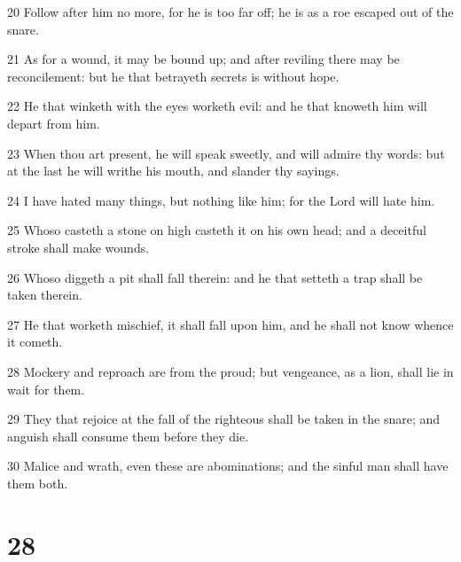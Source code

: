 \par 20 Follow after him no more, for he is too far off; he is as a roe escaped out of the snare.
\par 21 As for a wound, it may be bound up; and after reviling there may be reconcilement: but he that betrayeth secrets is without hope.
\par 22 He that winketh with the eyes worketh evil: and he that knoweth him will depart from him.
\par 23 When thou art present, he will speak sweetly, and will admire thy words: but at the last he will writhe his mouth, and slander thy sayings.
\par 24 I have hated many things, but nothing like him; for the Lord will hate him.
\par 25 Whoso casteth a stone on high casteth it on his own head; and a deceitful stroke shall make wounds.
\par 26 Whoso diggeth a pit shall fall therein: and he that setteth a trap shall be taken therein.
\par 27 He that worketh mischief, it shall fall upon him, and he shall not know whence it cometh.
\par 28 Mockery and reproach are from the proud; but vengeance, as a lion, shall lie in wait for them.
\par 29 They that rejoice at the fall of the righteous shall be taken in the snare; and anguish shall consume them before they die.
\par 30 Malice and wrath, even these are abominations; and the sinful man shall have them both.

\chapter{28}

